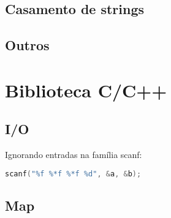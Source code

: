 \documentclass[a4paper,twocolumn, 10pt, landscape]{article}
\begin{document}
\subsection{Casamento de strings}


\subsection{Outros}





\section{Biblioteca C/C++}
\subsection{I/O}
Ignorando entradas na família scanf:
\begin{lstlisting}[language=c, label=cio, caption={Ignora os dois floats do meio. Retornará 2 no sucesso.}]
 scanf("%f %*f %*f %d", &a, &b);
\end{lstlisting}


\subsection{Map}

\end{document}
